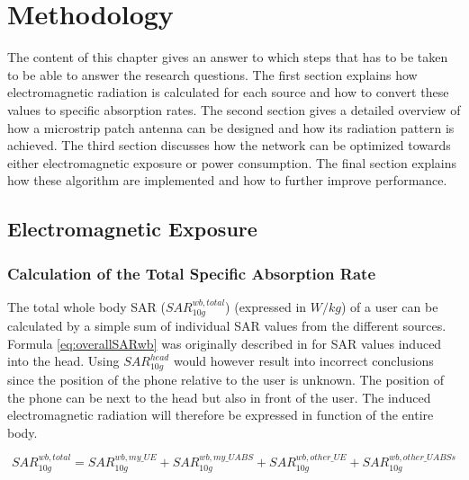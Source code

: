 \chapter{Methodology}
\label{chap:methodology}

The content of this chapter gives an answer to which steps that has to be taken to 
be able to answer the research questions.
The first section explains how electromagnetic radiation is calculated for each source
and how to convert these values to specific absorption rates. 
The second section gives a detailed overview of how a microstrip patch antenna can be 
designed and how its radiation pattern is achieved.
The third section discusses how the network can be optimized towards either electromagnetic 
exposure or power consumption.
The final section explains how these algorithm are implemented and how to further improve performance.

\section{Electromagnetic Exposure}
\subsection{Calculation of the Total Specific Absorption Rate} %
\label{sub:Calculationexposure}

The total whole body \gls{SAR} ($SAR^{wb,total}_{10g}$) (expressed in $W/kg$) of a user can be calculated by a simple sum of individual SAR values from the different sources.
Formula \ref{eq:overallSARwb} was originally described in \cite{J17_kuehn2019modelling} for \gls{SAR} values induced into the head.
Using $SAR^{head}_{10g}$ would however result into incorrect conclusions since 
the position of the phone relative to the user is unknown. 
The position of the phone can be next to the head but also in front of the user.
The induced electromagnetic radiation will therefore be expressed in function of the entire body.


\begin{equation} 
SAR^{wb,total}_{10g} = SAR^{wb,my\_UE}_{10g} +  SAR^{wb,my\_UABS}_{10g} + SAR^{wb,other\_UE}_{10g} + SAR^{wb,other\_UABSs}_{10g}
\label{eq:overallSARwb}
\end{equation}


